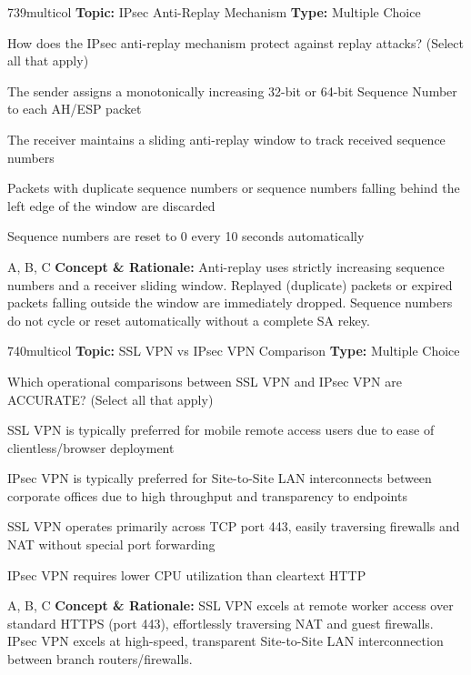 \begin{qcard}{739}{multicol}
\textcolor{darkslate!75}{\small\textbf{Topic:} IPsec Anti-Replay Mechanism \hfill \textbf{Type:} Multiple Choice}\vspace{0.4em}\par
How does the IPsec anti-replay mechanism protect against replay attacks? (Select all that apply)
\begin{qoptions}
\item The sender assigns a monotonically increasing 32-bit or 64-bit Sequence Number to each AH/ESP packet
\item The receiver maintains a sliding anti-replay window to track received sequence numbers
\item Packets with duplicate sequence numbers or sequence numbers falling behind the left edge of the window are discarded
\item Sequence numbers are reset to 0 every 10 seconds automatically
\end{qoptions}
\end{qcard}
\nopagebreak
\begin{explainbox}{A, B, C}
\textbf{Concept \& Rationale:} Anti-replay uses strictly increasing sequence numbers and a receiver sliding window. Replayed (duplicate) packets or expired packets falling outside the window are immediately dropped. Sequence numbers do not cycle or reset automatically without a complete SA rekey.
\end{explainbox}

\begin{qcard}{740}{multicol}
\textcolor{darkslate!75}{\small\textbf{Topic:} SSL VPN vs IPsec VPN Comparison \hfill \textbf{Type:} Multiple Choice}\vspace{0.4em}\par
Which operational comparisons between SSL VPN and IPsec VPN are ACCURATE? (Select all that apply)
\begin{qoptions}
\item SSL VPN is typically preferred for mobile remote access users due to ease of clientless/browser deployment
\item IPsec VPN is typically preferred for Site-to-Site LAN interconnects between corporate offices due to high throughput and transparency to endpoints
\item SSL VPN operates primarily across TCP port 443, easily traversing firewalls and NAT without special port forwarding
\item IPsec VPN requires lower CPU utilization than cleartext HTTP
\end{qoptions}
\end{qcard}
\nopagebreak
\begin{explainbox}{A, B, C}
\textbf{Concept \& Rationale:} SSL VPN excels at remote worker access over standard HTTPS (port 443), effortlessly traversing NAT and guest firewalls. IPsec VPN excels at high-speed, transparent Site-to-Site LAN interconnection between branch routers/firewalls.
\end{explainbox}
